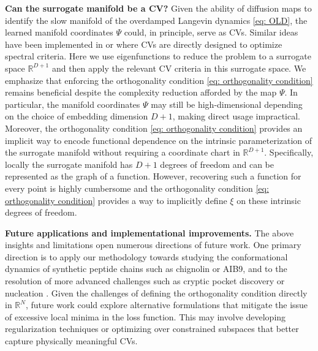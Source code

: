 \documentclass[reqno, 12pt]{article}
\begin{document}
{\bf Can the surrogate manifold be a CV?} Given the ability of diffusion maps to identify the slow manifold of the overdamped Langevin dynamics \eqref{eq: OLD}, the learned manifold coordinates \( \Psi \) could, in principle, serve as CVs. Similar ideas have been implemented in \cite{rydzewski2024spectral} or \cite{smith2018multi} where CVs are directly designed to optimize spectral criteria. Here we use eigenfunctions to reduce the problem to a surrogate space $\mathbb{R}^{D+1}$ and then apply the relevant CV criteria in this surrogate space. We emphasize that enforcing the orthogonality condition \eqref{eq: orthogonality condition} remains beneficial despite the complexity reduction afforded by the map $\Psi$. In particular, the manifold coordinates \( \Psi \) may still be high-dimensional depending on the choice of embedding dimension \( D+1 \), making direct usage impractical. Moreover, the orthogonality condition \eqref{eq: orthogonality condition} provides an implicit way to encode functional dependence on the intrinsic parameterization of the surrogate manifold without requiring a coordinate chart in \( \mathbb{R}^{D+1} \). Specifically, locally the surrogate manifold has $D+1$ degrees of freedom and can be represented as the graph of a function. However, recovering such a function for every point is highly cumbersome and the orthogonality condition \eqref{eq: orthogonality condition} provides a way to implicitly define $\xi$ on these intrinsic degrees of freedom. 

{\bf Future applications and implementational improvements.} The above insights and limitations open numerous directions of future work. One primary direction is to apply our methodology towards studying the conformational dynamics of synthetic peptide chains such as chignolin \cite{harada2011exploring} or AIB9, and to the resolution of more advanced challenges such as cryptic pocket discovery or \cite{wang2022data} nucleation \cite{wang2024local}. Given the challenges of defining the orthogonality condition directly in \( \mathbb{R}^{N} \), future work could explore alternative formulations that mitigate the issue of excessive local minima in the loss function. This may involve developing regularization techniques or optimizing over constrained subspaces that better capture physically meaningful CVs.
\end{document}
